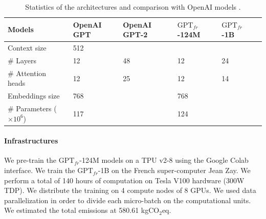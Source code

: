 \begin{table}[!ht]
\centering
    \begin{tabularx}{\textwidth}{l|YYYYY}
    Models & OpenAI GPT &  OpenAI GPT-2 & $\text{GPT}_{fr}$-124M & $\text{GPT}_{fr}$-1B \\\hline
    Context size & 512 &  &  &  \\
    \# Layers & 12 & 48 & 12 & 24 \\
    \# Attention heads & 12 & 25 & 12 & 14 \\
    Embeddings size & 768 &  & 768 &  \\
    \# Parameters ($\times 10^6$) & 117 &  & 124 & \\
    \end{tabularx}
\caption{ Statistics of the architectures and comparison with OpenAI models \parencite{radford_2018, radford_2019}.}
\end{table}

\paragraph{Infrastructures} We pre-train the $\text{GPT}_{fr}$-124M models on a TPU v2-8 using the Google Colab interface. We train the $\text{GPT}_{fr}$-1B on the French super-computer Jean Zay. We perform a total of 140 hours of computation on Tesla V100 hardware (300W TDP). We distribute the training on 4 compute nodes of 8 GPUs. We used data parallelization in order to divide each micro-batch on the computational units. We estimated the total emissions at 580.61 kgCO$_2$eq.

